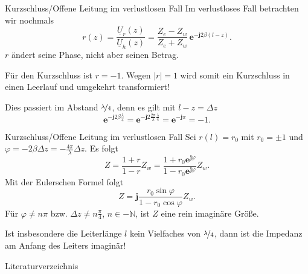 \documentclass{beamer}
\begin{document}
\begin{frame}{Kurzschluss/Offene Leitung im verlustlosen Fall}
Im verlustloses Fall betrachten wir nochmals
\[
r(z) = \frac{\underline{U}_{r}(z)}{\underline{U}_{h}(z)} =
\frac{Z_{e}-Z_{w}}{Z_{e}+Z_{w}} \, \mathbf{e}^{-\mathbf{j} 2 \beta (l-z)}.
\]
$r$ ändert seine Phase, nicht aber seinen Betrag.
\vspace{1ex}

Für den Kurzschluss ist $r=-1$. Wegen $|r|=1$ wird somit ein Kurzschluss in einen Leerlauf und
umgekehrt transformiert!

\vspace{1ex}
Dies passiert im Abstand $\nicefrac{\lambda}{4}$, denn es gilt mit $l - z = \Delta z$
\[
\mathbf{e}^{- \mathbf{j} 2 \beta \frac{\lambda}{4}} =
\mathbf{e}^{- \mathbf{j} 2 \frac{2 \pi}{\lambda} \frac{\lambda}{4}} =
\mathbf{e}^{- \mathbf{j} \pi} = -1.
\]
\end{frame}


\begin{frame}{Kurzschluss/Offene Leitung im verlustlosen Fall}
Sei $r(l) = r_{0}$ mit $r_{0} = \pm 1$ und
$\varphi = - 2 \beta \Delta z = - \frac{4 \pi}{\lambda} \Delta z$.
Es folgt
\[
Z = \frac{1 + r}{1 - r} Z_{w} =
\frac{1 + r_{0} \mathbf{e}^{\mathbf{j} \varphi}}{1 - r_{0} \mathbf{e}^{\mathbf{j} \varphi}} Z_{w}.
\] Mit der Eulerschen Formel folgt
\[
Z = \mathbf{j} \frac{r_{0} \sin \varphi}{1 - r_{0} \cos \varphi} Z_{w}.
\]
Für $\varphi \ne n \pi$ bzw. $\Delta z \ne n \frac{\pi}{4}$, $n \in - \mathbb{N}$, ist $Z$ eine
rein imaginäre Größe.

Ist insbesondere die Leiterlänge $l$ kein Vielfaches von $\nicefrac{\lambda}{4}$, dann ist die Impedanz am
Anfang des Leiters imaginär!
\end{frame}




\begin{frame}{Literaturverzeichnis}
\printbibliography
\end{frame}
\end{document}
